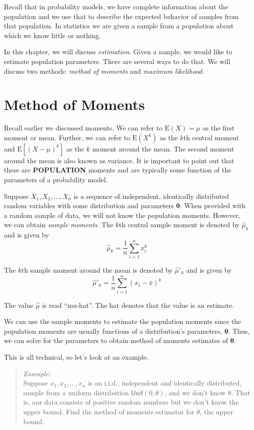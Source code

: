 \documentclass[
  letterpaper,
  DIV=11,
  numbers=noendperiod]{scrreprt}
\begin{document}
Recall that in probability models, we have complete information about
the population and we use that to describe the expected behavior of
samples from that population. In statistics we are given a sample from a
population about which we know little or nothing.

In this chapter, we will discuss \emph{estimation}. Given a sample, we
would like to estimate population parameters. There are several ways to
do that. We will discuss two methods: \emph{method of moments} and
\emph{maximum likelihood}.

\section{Method of Moments}\label{method-of-moments}

Recall earlier we discussed moments. We can refer to
\(\mbox{E}(X) = \mu\) as the first moment or mean. Further, we can refer
to \(\mbox{E}(X^k)\) as the \(k\)th central moment and
\(\mbox{E}[(X-\mu)^k]\) as the \(k\) moment around the mean. The second
moment around the mean is also known as variance. It is important to
point out that these are \textbf{POPULATION} moments and are typically
some function of the parameters of a probability model.

Suppose \(X_1,X_2,...,X_n\) is a sequence of independent, identically
distributed random variables with some distribution and parameters
\(\boldsymbol{\theta}\). When provided with a random sample of data, we
will not know the population moments. However, we can obtain
\emph{sample moments}. The \(k\)th central sample moment is denoted by
\(\hat{\mu}_k\) and is given by \[
\hat{\mu}_k = \frac{1}{n}\sum_{i=1}^n x_i^k
\]

The \(k\)th sample moment around the mean is denoted by \(\hat{\mu}'_k\)
and is given by \[
\hat{\mu}'_k=\frac{1}{n} \sum_{i=1}^n (x_i-\bar{x})^k
\]

The value \(\hat{\mu}\) is read ``mu-hat''. The hat denotes that the
value is an estimate.

We can use the sample moments to estimate the population moments since
the population moments are usually functions of a distribution's
parameters, \(\boldsymbol{\theta}\). Thus, we can solve for the
parameters to obtain method of moments estimates of
\(\boldsymbol{\theta}\).

This is all technical, so let's look at an example.

\begin{quote}
\emph{Example}:\\
Suppose \(x_1,x_2,...,x_n\) is an i.i.d., independent and identically
distributed, sample from a uniform distribution
\(\textsf{Unif}(0,\theta)\), and we don't know \(\theta\). That is, our
data consists of positive random numbers but we don't know the upper
bound. Find the method of moments estimator for \(\theta\), the upper
bound.
\end{quote}
\end{document}
